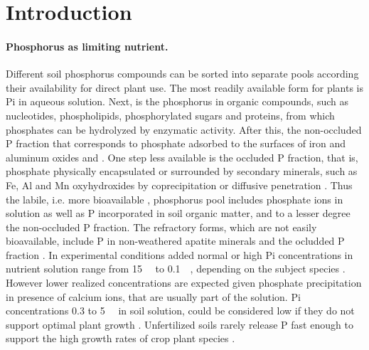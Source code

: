 \documentclass[10pt,letterpaper]{article}
\begin{document}
\linenumbers

\section*{Introduction}

\paragraph{Phosphorus as limiting nutrient.} 
Different soil phosphorus compounds can be sorted into separate pools according their availability for direct plant use. The most readily available form for plants is Pi in aqueous solution. Next, is the phosphorus in organic compounds, such as nucleotides, phospholipids, phosphorylated sugars and proteins, from which phosphates can be hydrolyzed by enzymatic activity. After this, the non-occluded P fraction that corresponds to phosphate adsorbed to the surfaces of iron and aluminum oxides and  \cite{walker1976}. One step less available is the occluded P fraction, that is, phosphate physically encapsulated or surrounded by secondary minerals, such as Fe, Al and Mn oxyhydroxides \cite{yang2013, filipelli2016} by coprecipitation or diffusive penetration \cite{walker1976}. Thus the labile, i.e. more bioavailable \cite{yang2013}, phosphorus pool includes phosphate ions in solution as well as P incorporated in soil organic matter, and to a lesser degree the non-occluded P fraction. The refractory forms, which are not easily bioavailable, include P in non-weathered apatite minerals and the ocludded P fraction \cite{filipelli2016}. 
In experimental conditions added normal or high Pi concentrations in nutrient solution range from \SI{15}{\micro\molar} to \SI{0.1}{\milli\molar}, depending on the subject species \cite{scheible2015}. However lower realized concentrations are expected given phosphate precipitation in presence of calcium ions, that are usually part of the solution. Pi concentrations 0.3 to \SI{5}{\micro\molar} in soil solution, could be considered low if they do not support optimal plant growth \cite{scheible2015,schachtman1998}. Unfertilized soils rarely release P fast enough to support the high growth rates of crop plant species \cite{schachtman1998}.
\end{document}
